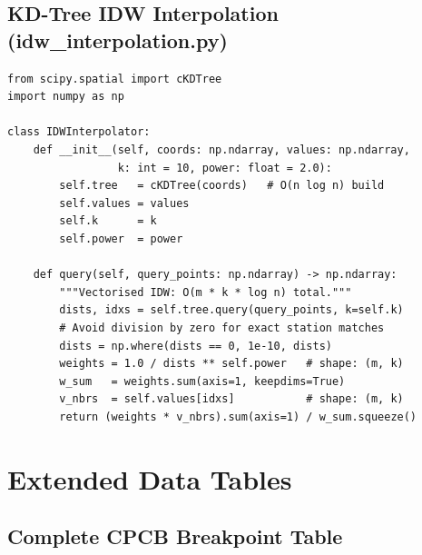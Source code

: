\documentclass[12pt,a4paper]{article}
\begin{document}
\subsection{KD-Tree IDW Interpolation (idw\_interpolation.py)}
\label{app:code:idw}

\begin{lstlisting}[caption={KD-tree optimised IDW query
                            (backend/core/idw\_interpolation.py, lines 44--73)},
                   label=lst:idw]
from scipy.spatial import cKDTree
import numpy as np

class IDWInterpolator:
    def __init__(self, coords: np.ndarray, values: np.ndarray,
                 k: int = 10, power: float = 2.0):
        self.tree   = cKDTree(coords)   # O(n log n) build
        self.values = values
        self.k      = k
        self.power  = power

    def query(self, query_points: np.ndarray) -> np.ndarray:
        """Vectorised IDW: O(m * k * log n) total."""
        dists, idxs = self.tree.query(query_points, k=self.k)
        # Avoid division by zero for exact station matches
        dists = np.where(dists == 0, 1e-10, dists)
        weights = 1.0 / dists ** self.power   # shape: (m, k)
        w_sum   = weights.sum(axis=1, keepdims=True)
        v_nbrs  = self.values[idxs]           # shape: (m, k)
        return (weights * v_nbrs).sum(axis=1) / w_sum.squeeze()
\end{lstlisting}

\clearpage

\section{Extended Data Tables}
\label{app:tables}

\subsection{Complete CPCB Breakpoint Table}
\label{app:tables:breaks}
\end{document}

